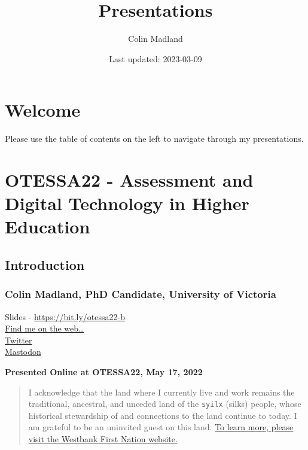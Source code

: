\documentclass[
]{book}
\title{Presentations}
\author{Colin Madland}
\date{Last updated: 2023-03-09}
\begin{document}
\maketitle

{
\setcounter{tocdepth}{1}
\tableofcontents
}
\hypertarget{welcome}{%
\chapter*{Welcome}\label{welcome}}

Please use the table of contents on the left to navigate through my presentations.

\hypertarget{otessa22---assessment-and-digital-technology-in-higher-education}{%
\chapter{OTESSA22 - Assessment and Digital Technology in Higher Education}\label{otessa22---assessment-and-digital-technology-in-higher-education}}

\hypertarget{introduction}{%
\section*{Introduction}\label{introduction}}

\hypertarget{colin-madland-phd-candidate-university-of-victoria}{%
\subsection*{Colin Madland, PhD Candidate, University of Victoria}\label{colin-madland-phd-candidate-university-of-victoria}}

Slides - \url{https://bit.ly/otessa22-b}\\
\href{https://cmad.land}{Find me on the web\ldots{}}\\
\href{https://twitter.com/colinmadland}{Twitter}\\
\href{https://scholar.social/web/@Cmadland}{Mastodon}

\textbf{Presented Online at OTESSA22, May 17, 2022}

\begin{quote}
I acknowledge that the land where I currently live and work remains the traditional, ancestral, and unceded land of the \texttt{syilx} (silks) people, whose historical stewardship of and connections to the land continue to today. I am grateful to be an uninvited guest on this land. \href{https://wfn.ca}{To learn more, please visit the Westbank First Nation website.}
\end{quote}
\end{document}
